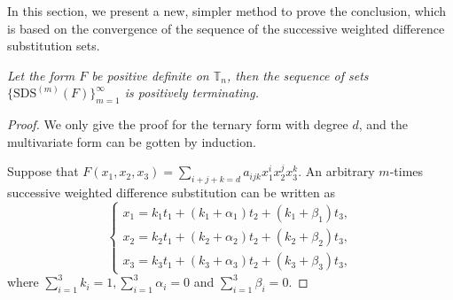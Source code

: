 \documentclass [10pt,a4paper]{article}
\begin{document}
In this section, we present a new, simpler method to prove the
conclusion, which is based on the convergence
 of the sequence of the successive weighted dif\mbox{}ference substitution sets.

\begin{theorem} \label{zd}
\emph{Let the form  $F$ be positive def\mbox{}inite on
$\mathbb{T}_n$, then the sequence of  sets
$\{\textrm{SDS}^{(m)}(F)\}_{m=1}^\infty$ is positively terminating.}
\end{theorem}
\begin{proof} We only give the proof for the ternary form with
degree $d$, and the multivariate form can be gotten by induction.

Suppose that
$F(x_1,x_2,x_3)=\sum\limits_{i+j+k=d}a_{ijk}x_1^ix_2^jx_3^k$. An
arbitrary $m$-times successive weighted dif\mbox{}ference
substitution can be written as
\begin{equation} \label{eq11}
\left\{ \begin{array}{l} x_1  =  k_{1}t_1+(k_{1}+\alpha_1)t_2+(k_{1}+\beta_1)t_3,\\
x_2  =  k_{2}t_1+(k_{2}+\alpha_2)t_2+(k_{2}+\beta_2)t_3,\\
x_3  =  k_{3}t_1+(k_{3}+\alpha_3)t_2+(k_{3}+\beta_3)t_3,
\end{array}\right.
\end{equation}
where $ \sum\limits_{i=1}^3k_i =1, \sum\limits_{i=1}^3\alpha_i = 0$
and $ \sum\limits_{i=1}^3\beta_i=0 $.



\end{proof}
\end{document}

